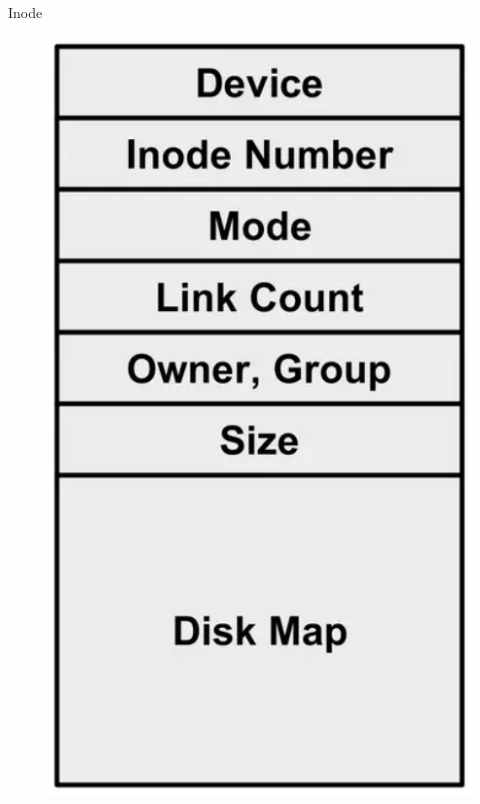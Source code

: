 \documentclass[xcolor=table]{beamer}
\begin{document}
\begin{frame}[allowframebreaks]{Inode}
        \begin{figure}
            \centering
            \includegraphics[width=\textwidth,height=0.8\textheight,keepaspectratio]{images/inode1.png}
            \label{fig:inode1.png}
        \end{figure}
    \end{frame}
    
\end{document}

